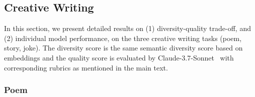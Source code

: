 \subsection{Creative Writing}\label{appendix:creativity}
In this section, we present detailed results  on (1) diversity-quality trade-off, and (2) individual model performance, on the three creative writing tasks (poem, story, joke). 
The diversity score is the same semantic diversity score based on embeddings and the quality score is evaluated by Claude-3.7-Sonnet~\citep{AnthropicClaude4} with corresponding rubrics as mentioned in the main text. 


\subsubsection{Poem}\label{tab:model_comparison_creativity}
